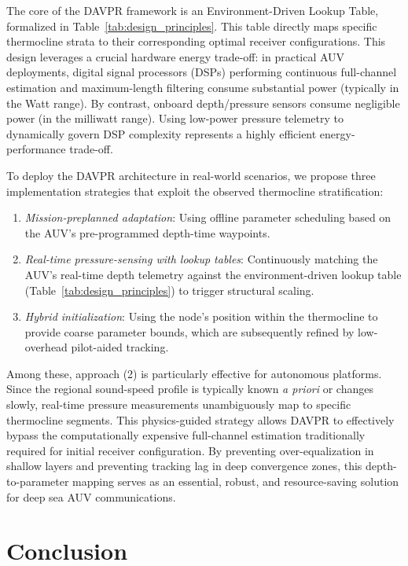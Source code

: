 \documentclass[lettersize,journal]{IEEEtran}
\begin{document}
The core of the DAVPR framework is an Environment-Driven Lookup Table, formalized in Table~\ref{tab:design_principles}. This table directly maps specific thermocline strata to their corresponding optimal receiver configurations. This design leverages a crucial hardware energy trade-off: in practical AUV deployments, digital signal processors (DSPs) performing continuous full-channel estimation and maximum-length filtering consume substantial power (typically in the Watt range). By contrast, onboard depth/pressure sensors consume negligible power (in the milliwatt range). Using low-power pressure telemetry to dynamically govern DSP complexity represents a highly efficient energy-performance trade-off.

To deploy the DAVPR architecture in real-world scenarios, we propose three implementation strategies that exploit the observed thermocline stratification:
\begin{enumerate}
    \item \textit{Mission-preplanned adaptation}: Using offline parameter scheduling based on the AUV's pre-programmed depth-time waypoints.
    \item \textit{Real-time pressure-sensing with lookup tables}: Continuously matching the AUV's real-time depth telemetry against the environment-driven lookup table (Table~\ref{tab:design_principles}) to trigger structural scaling.
    \item \textit{Hybrid initialization}: Using the node's position within the thermocline to provide coarse parameter bounds, which are subsequently refined by low-overhead pilot-aided tracking.
\end{enumerate}

Among these, approach (2) is particularly effective for autonomous platforms. Since the regional sound-speed profile is typically known \textit{a priori} or changes slowly, real-time pressure measurements unambiguously map to specific thermocline segments. This physics-guided strategy allows DAVPR to effectively bypass the computationally expensive full-channel estimation traditionally required for initial receiver configuration. By preventing over-equalization in shallow layers and preventing tracking lag in deep convergence zones, this depth-to-parameter mapping serves as an essential, robust, and resource-saving solution for deep sea AUV communications.

\section{Conclusion}
\label{sec:conclusion}
\end{document}
